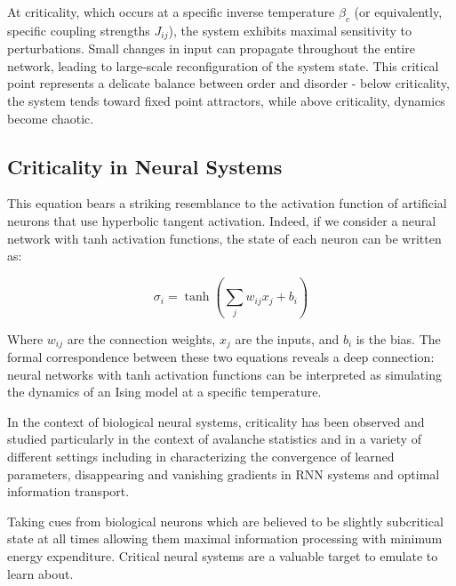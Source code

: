 At criticality, which occurs at a specific inverse temperature $\beta_c$ (or equivalently, specific coupling strengths $J_{ij}$), the system exhibits maximal sensitivity to perturbations. Small changes in input can propagate throughout the entire network, leading to large-scale reconfiguration of the system state. This critical point represents a delicate balance between order and disorder - below criticality, the system tends toward fixed point attractors, while above criticality, dynamics become chaotic.

\subsection{Criticality in Neural Systems}

This equation bears a striking resemblance to the activation function of artificial neurons that use hyperbolic tangent activation. Indeed, if we consider a neural network with tanh activation functions, the state of each neuron can be written as:

$$\sigma_i = \tanh(\sum_j w_{ij}x_j + b_i)$$

Where $w_{ij}$ are the connection weights, $x_j$ are the inputs, and $b_i$ is the bias. The formal correspondence between these two equations reveals a deep connection: neural networks with tanh activation functions can be interpreted as simulating the dynamics of an Ising model at a specific temperature.

In the context of biological neural systems, criticality has been observed and studied particularly in the context of avalanche statistics and in a variety of different settings including in characterizing the convergence of learned parameters, disappearing and vanishing gradients in RNN systems and optimal information transport.

Taking cues from biological neurons which are believed to be slightly subcritical state at all times allowing them maximal information processing with minimum energy expenditure. Critical neural systems are a valuable target to emulate to learn about.